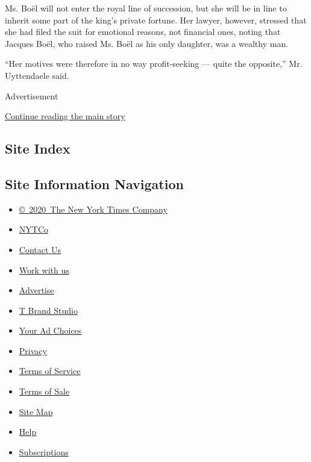 Ms. Boël will not enter the royal line of succession, but she will be in
line to inherit some part of the king's private fortune. Her lawyer,
however, stressed that she had filed the suit for emotional reasons, not
financial ones, noting that Jacques Boël, who raised Ms. Boël as his
only daughter, was a wealthy man.

``Her motives were therefore in no way profit-seeking --- quite the
opposite,'' Mr. Uyttendaele said.

Advertisement

\protect\hyperlink{after-bottom}{Continue reading the main story}

\hypertarget{site-index}{%
\subsection{Site Index}\label{site-index}}

\hypertarget{site-information-navigation}{%
\subsection{Site Information
Navigation}\label{site-information-navigation}}

\begin{itemize}
\tightlist
\item
  \href{https://help.nytimes.com/hc/en-us/articles/115014792127-Copyright-notice}{©~2020~The
  New York Times Company}
\end{itemize}

\begin{itemize}
\tightlist
\item
  \href{https://www.nytco.com/}{NYTCo}
\item
  \href{https://help.nytimes.com/hc/en-us/articles/115015385887-Contact-Us}{Contact
  Us}
\item
  \href{https://www.nytco.com/careers/}{Work with us}
\item
  \href{https://nytmediakit.com/}{Advertise}
\item
  \href{http://www.tbrandstudio.com/}{T Brand Studio}
\item
  \href{https://www.nytimes.com/privacy/cookie-policy\#how-do-i-manage-trackers}{Your
  Ad Choices}
\item
  \href{https://www.nytimes.com/privacy}{Privacy}
\item
  \href{https://help.nytimes.com/hc/en-us/articles/115014893428-Terms-of-service}{Terms
  of Service}
\item
  \href{https://help.nytimes.com/hc/en-us/articles/115014893968-Terms-of-sale}{Terms
  of Sale}
\item
  \href{https://spiderbites.nytimes.com}{Site Map}
\item
  \href{https://help.nytimes.com/hc/en-us}{Help}
\item
  \href{https://www.nytimes.com/subscription?campaignId=37WXW}{Subscriptions}
\end{itemize}

